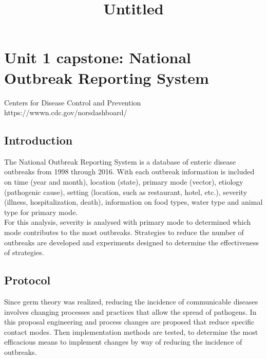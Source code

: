 \documentclass[11pt]{article}
\title{Untitled}
\begin{document}
    
    
    \maketitle
    
    

    
    \hypertarget{unit-1-capstone-national-outbreak-reporting-system}{%
\section{Unit 1 capstone: National Outbreak Reporting
System}\label{unit-1-capstone-national-outbreak-reporting-system}}

Centers for Disease Control and Prevention\\
https://wwwn.cdc.gov/norsdashboard/

    \hypertarget{introduction}{%
\subsection{Introduction}\label{introduction}}

The National Outbreak Reporting System is a database of enteric disease
outbreaks from 1998 through 2016. With each outbreak information is
included on time (year and month), location (state), primary mode
(vector), etiology (pathogenic cause), setting (location, such as
restaurant, hotel, etc.), severity (illness, hospitalization, death),
information on food types, water type and animal type for primary
mode.\\
For this analysis, severity is analysed with primary mode to determined
which mode contributes to the most outbreaks. Strategies to reduce the
number of outbreaks are developed and experiments designed to determine
the effectiveness of strategies.

    \hypertarget{protocol}{%
\subsection{Protocol}\label{protocol}}

Since germ theory was realized, reducing the incidence of communicable
diseases involves changing processes and practices that allow the spread
of pathogens. In this proposal engineering and process changes are
proposed that reduce specific contact modes. Then implementation methods
are tested, to determine the most efficacious means to implement changes
by way of reducing the incidence of outbreaks.
\end{document}
